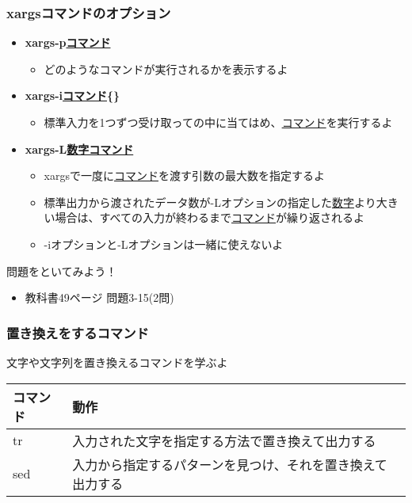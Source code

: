 \begin{frame}
    \frametitle{xargsコマンドのオプション}
    \begin{itemize}
        \item {\bf xargs\textvisiblespace -p\textvisiblespace\underline{コマンド}}
        \begin{itemize}
            \small
            \item どのようなコマンドが実行されるかを表示するよ
        \end{itemize}
        \item {\bf xargs\textvisiblespace -i\textvisiblespace\underline{コマンド}\textvisiblespace\{\}}
        \begin{itemize}
            \small
            \item 標準入力を1つずつ受け取って{}の中に当てはめ、\underline{コマンド}を実行するよ
        \end{itemize}
        \item {\bf xargs\textvisiblespace -L\textvisiblespace\underline{数字}\textvisiblespace\underline{コマンド}}
        \begin{itemize}
            \small
            \item xargsで一度に\underline{コマンド}を渡す引数の最大数を指定するよ
            \item 標準出力から渡されたデータ数が-Lオプションの指定した\underline{数字}より大きい場合は、すべての入力が終わるまで\underline{コマンド}が繰り返されるよ
            \item -iオプションと-Lオプションは一緒に使えないよ
        \end{itemize}
    \end{itemize}
\end{frame}

\begin{frame}
    \begin{exampleblock}{問題をといてみよう！}
        \begin{itemize}
            \item 教科書49ページ 問題3-15(2問)
        \end{itemize}
    \end{exampleblock} 
\end{frame}

\begin{frame}
    \frametitle{置き換えをするコマンド}
    文字や文字列を置き換えるコマンドを学ぶよ\\
    \vspace{\zh}
    \begin{tabular}{lp{}}
        コマンド & 動作                                                       \\ \hline
        tr       & 入力された文字を指定する方法で置き換えて出力する           \\
        sed      & 入力から指定するパターンを見つけ、それを置き換えて出力する \\ \hline
    \end{tabular}
\end{frame}

